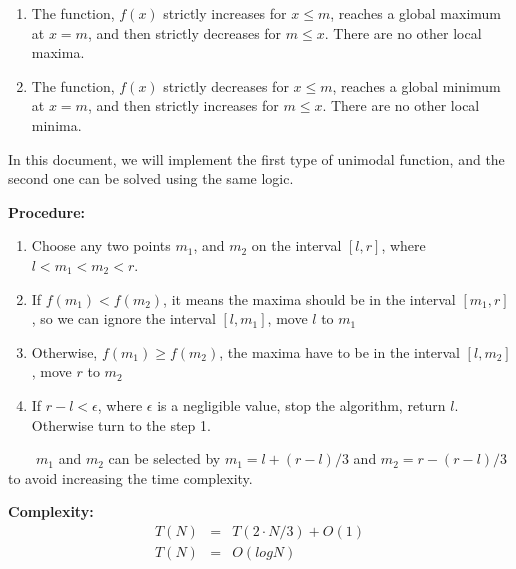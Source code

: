 \documentclass[12pt]{article}
\begin{document}
\begin{enumerate}
	\item The function, $f(x)$ strictly increases for $x \leq m$, reaches a global maximum at $x = m$, and then strictly decreases for $m \leq x$. There are no other local maxima.
	
	\item The function, $f(x)$ strictly decreases for $x \leq m$, reaches a global minimum at $x = m$, and then strictly increases for $m \leq x$. There are no other local minima.
\end{enumerate}

In this document, we will implement the first type of unimodal function, and the second one can be solved using the same logic.

\textbf{Procedure: }
\begin{enumerate}
	\item Choose any two points $m_1$, and $m_2$ on the interval $[l, r]$, where $l < m_1 < m_2 < r$.
	\item If $f(m_1) < f(m_2)$, it means the maxima should be in the interval $[m_1, r]$, so we can ignore the interval $[l, m_1]$, move $l$ to $m_1$
	\item Otherwise, $f(m_1) \geq f(m_2)$, the maxima have to be in the interval $[l, m_2]$, move $r$ to $m_2$
	\item If $r - l < \epsilon$, where $\epsilon$ is a negligible value, stop the algorithm, return $l$. Otherwise turn to the step 1. 
\end{enumerate}	

\ \ \ \  $m_1$ and $m_2$ can be selected by $m_1 = l + (r - l) / 3$ and $m_2 = r - (r - l) / 3$ to avoid increasing the time complexity.

\textbf{Complexity: }
\begin{eqnarray*}
	T(N) &=& T(2 \cdot N / 3) + O(1) \\
	T(N) &=& O(logN)
\end{eqnarray*}
\end{document}
